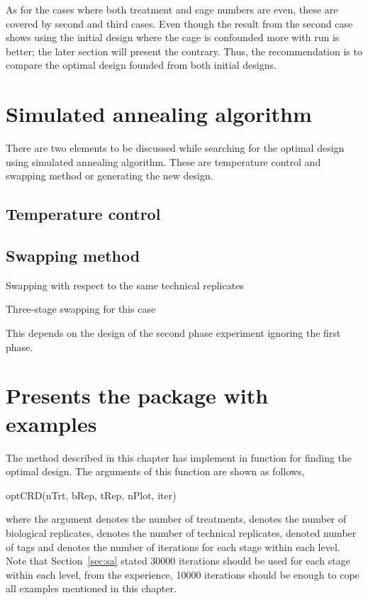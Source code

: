 \documentclass[article]{jss}
\begin{document}
As for the cases where both treatment and cage numbers are even, these are covered by second and third cases. Even though the result from the second case shows using the initial design where the cage is confounded more with run is better; the later section will present the contrary. Thus, the recommendation is to compare the optimal design founded from both initial designs. 

\section[Simulated annealing algorithm]{Simulated annealing algorithm}
There are two elements to be discussed while searching for the optimal design using simulated annealing algorithm. These are temperature control and swapping method or generating the new design. 


\subsection{Temperature control}


\subsection{Swapping method}
Swapping with respect to the same technical replicates 

Three-stage swapping for this case 

This depends on the design of the second phase experiment ignoring the first phase. 

 


\section[Presents the package with examples]{Presents the package with examples}

The method described in this chapter has implement in  function  for finding the optimal design. The arguments of this function are shown as follows, 
\begin{CodeChunk}
\begin{CodeInput}
optCRD(nTrt, bRep, tRep, nPlot, iter)
\end{CodeInput}
\end{CodeChunk}
where the argument  denotes the number of treatments,  denotes the number of biological replicates,  denotes the number of technical replicates,  denoted number of tags and  denotes the number of iterations for each stage within each level. Note that Section~\ref{sec:sa} stated 30000 iterations should be used for each stage within each level, from the experience, 10000 iterations should be enough to cope all examples mentioned in this chapter.
\end{document}
